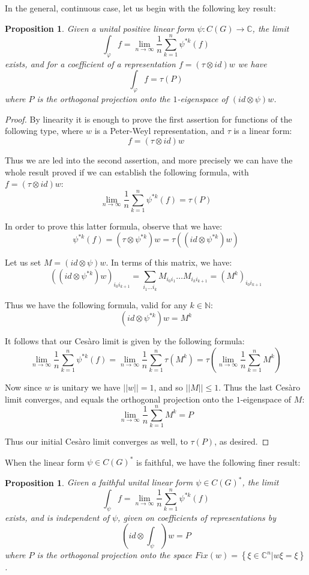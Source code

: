 \documentclass[12pt]{amsbook}
\newtheorem{proposition}[theorem]{Proposition}
\begin{document}
In the general, continuous case, let us begin with the following key result:

\begin{proposition}
Given a unital positive linear form $\psi:C(G)\to\mathbb C$, the limit
$$\int_\varphi f=\lim_{n\to\infty}\frac{1}{n}\sum_{k=1}^n\psi^{*k}(f)$$
exists, and for a coefficient of a representation $f=(\tau\otimes id)w$ we have
$$\int_\varphi f=\tau(P)$$
where $P$ is the orthogonal projection onto the $1$-eigenspace of $(id\otimes\psi)w$.
\end{proposition}

\begin{proof}
By linearity it is enough to prove the first assertion for functions of the following type, where $w$ is a Peter-Weyl representation, and $\tau$ is a linear form:
$$f=(\tau\otimes id)w$$

Thus we are led into the second assertion, and more precisely we can have the whole result proved if we can establish the following formula, with $f=(\tau\otimes id)w$:
$$\lim_{n\to\infty}\frac{1}{n}\sum_{k=1}^n\psi^{*k}(f)=\tau(P)$$

In order to prove this latter formula, observe that we have:
$$\psi^{*k}(f)
=(\tau\otimes\psi^{*k})w
=\tau((id\otimes\psi^{*k})w)$$

Let us set $M=(id\otimes\psi)w$. In terms of this matrix, we have:
$$((id\otimes\psi^{*k})w)_{i_0i_{k+1}}
=\sum_{i_1\ldots i_k}M_{i_0i_1}\ldots M_{i_ki_{k+1}}
=(M^k)_{i_0i_{k+1}}$$

Thus we have the following formula, valid for any $k\in\mathbb N$:
$$(id\otimes\psi^{*k})w=M^k$$

It follows that our Ces\`aro limit is given by the following formula:
$$\lim_{n\to\infty}\frac{1}{n}\sum_{k=1}^n\psi^{*k}(f)
=\lim_{n\to\infty}\frac{1}{n}\sum_{k=1}^n\tau(M^k)
=\tau\left(\lim_{n\to\infty}\frac{1}{n}\sum_{k=1}^nM^k\right)$$

Now since $w$ is unitary we have $||w||=1$, and so $||M||\leq1$. Thus the last Ces\`aro limit converges, and equals the orthogonal projection onto the $1$-eigenspace of $M$:
$$\lim_{n\to\infty}\frac{1}{n}\sum_{k=1}^nM^k=P$$

Thus our initial Ces\`aro limit converges as well, to $\tau(P)$, as desired.
\end{proof}

When the linear form $\psi\in C(G)^*$ is faithful, we have the following finer result:

\begin{proposition}
Given a faithful unital linear form $\psi\in C(G)^*$, the limit
$$\int_\psi f=\lim_{n\to\infty}\frac{1}{n}\sum_{k=1}^n\psi^{*k}(f)$$
exists, and is independent of $\psi$, given on coefficients of representations by
$$\left(id\otimes\int_\psi\right)w=P$$
where $P$ is the orthogonal projection onto the space $Fix(w)=\left\{\xi\in\mathbb C^n\big|w\xi=\xi\right\}$.
\end{proposition}
\end{document}
